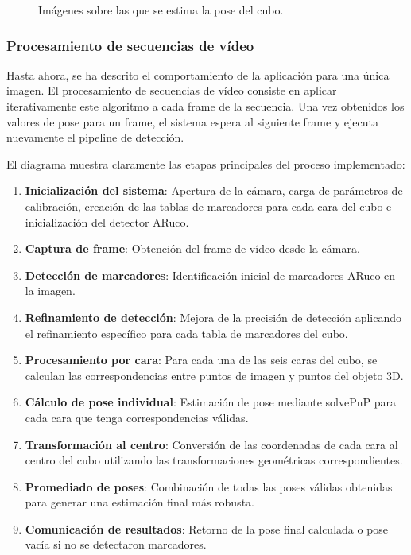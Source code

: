 \begin{figure}%
	\centering
	\qquad
	\caption{Imágenes sobre las que se estima la pose del cubo.}%
	\label{fig:cubo_detected}%
\end{figure}

\subsubsection{Procesamiento de secuencias de vídeo}
Hasta ahora, se ha descrito el comportamiento de la aplicación para una única imagen. El procesamiento de secuencias de vídeo consiste en aplicar iterativamente este algoritmo a cada frame de la secuencia. Una vez obtenidos los valores de pose para un frame, el sistema espera al siguiente frame y ejecuta nuevamente el pipeline de detección.

El diagrama muestra claramente las etapas principales del proceso implementado:
\begin{enumerate}
    \item \textbf{Inicialización del sistema}: Apertura de la cámara, carga de parámetros de calibración, creación de las tablas de marcadores para cada cara del cubo e inicialización del detector ARuco.
    \item \textbf{Captura de frame}: Obtención del frame de vídeo desde la cámara.
    \item \textbf{Detección de marcadores}: Identificación inicial de marcadores ARuco en la imagen.
    \item \textbf{Refinamiento de detección}: Mejora de la precisión de detección aplicando el refinamiento específico para cada tabla de marcadores del cubo.
    \item \textbf{Procesamiento por cara}: Para cada una de las seis caras del cubo, se calculan las correspondencias entre puntos de imagen y puntos del objeto 3D.
    \item \textbf{Cálculo de pose individual}: Estimación de pose mediante solvePnP para cada cara que tenga correspondencias válidas.
    \item \textbf{Transformación al centro}: Conversión de las coordenadas de cada cara al centro del cubo utilizando las transformaciones geométricas correspondientes.
    \item \textbf{Promediado de poses}: Combinación de todas las poses válidas obtenidas para generar una estimación final más robusta.
    \item \textbf{Comunicación de resultados}: Retorno de la pose final calculada o pose vacía si no se detectaron marcadores.
\end{enumerate}

